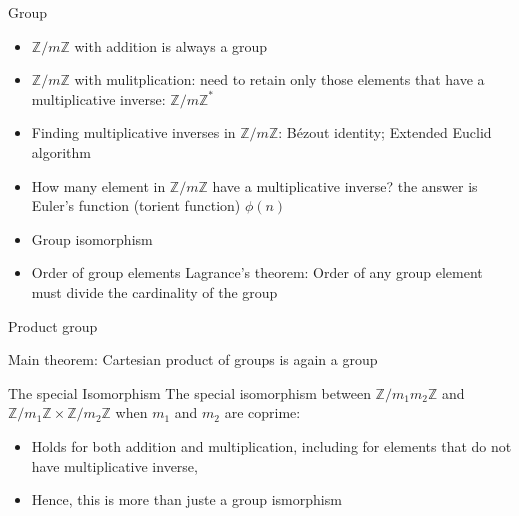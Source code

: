 \begin{parag}{Group}
    \begin{itemize}
        \item $ \mathbb{Z} / m \mathbb{Z}$ with addition is always a group
        \item $ \mathbb{Z} / m \mathbb{Z}$ with mulitplication: need to retain only those elements that have a multiplicative inverse: $ \mathbb{Z} / m \mathbb{Z}^*$
        \item Finding multiplicative inverses in $ \mathbb{Z} / m \mathbb{Z}$: Bézout identity; Extended Euclid algorithm
    \item How many element in $ \mathbb{Z} / m \mathbb{Z}$ have a multiplicative inverse? the answer is Euler's function (torient function) $\phi\left(n\right)$
    \item Group isomorphism
    \item Order of group elements Lagrance's theorem: Order of any group element must divide the cardinality of the group
    \end{itemize}
    
\end{parag}
\begin{parag}{Product group}
    \begin{theoreme}
    Main theorem: Cartesian product of groups is again a group
    \end{theoreme}
\end{parag}

\begin{parag}{The special Isomorphism}
    The special isomorphism between $ \mathbb{Z} / m_1m_2 \mathbb{Z}$ and $ \mathbb{Z} / m_1 \mathbb{Z} \times \mathbb{Z} / m_2 \mathbb{Z}$ when $m_1$ and $m_2$ are coprime:
    \begin{itemize}
        \item Holds for both addition and multiplication, including for elements that do not have multiplicative inverse,
        \item Hence, this is more than juste a group ismorphism
        
    \end{itemize}
    
    
\end{parag}


